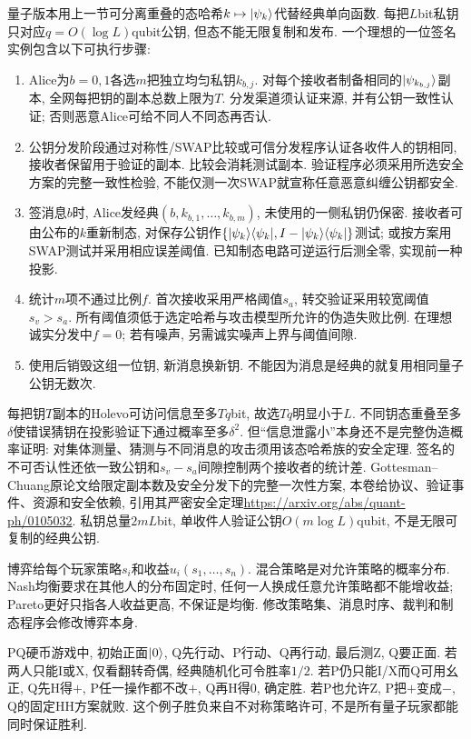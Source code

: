 量子版本用上一节可分离重叠的态哈希$k\mapsto\lvert \psi_k\rangle$代替经典单向函数. 每把$L$bit私钥只对应$q=O(\log L)$qubit公钥, 但态不能无限复制和发布. 一个理想的一位签名实例包含以下可执行步骤:
\begin{enumerate}
\item Alice为$b=0,1$各选$m$把独立均匀私钥$k_{b,j}$. 对每个接收者制备相同的$\lvert \psi_{k_{b,j}}\rangle$副本, 全网每把钥的副本总数上限为$T$. 分发渠道须认证来源, 并有公钥一致性认证; 否则恶意Alice可给不同人不同态再否认.
\item 公钥分发阶段通过对称性/SWAP比较或可信分发程序认证各收件人的钥相同, 接收者保留用于验证的副本. 比较会消耗测试副本. 验证程序必须采用所选安全方案的完整一致性检验, 不能仅测一次SWAP就宣称任意恶意纠缠公钥都安全.
\item 签消息$b$时, Alice发经典$(b,k_{b,1},\ldots,k_{b,m})$, 未使用的一侧私钥仍保密. 接收者可由公布的$k$重新制态, 对保存公钥作$\{\lvert \psi_k\rangle\langle \psi_k\rvert,I-\lvert \psi_k\rangle\langle \psi_k\rvert\}$测试; 或按方案用SWAP测试并采用相应误差阈值. 已知制态电路可逆运行后测全零, 实现前一种投影.
\item 统计$m$项不通过比例$f$. 首次接收采用严格阈值$s_a$, 转交验证采用较宽阈值$s_v>s_a$. 所有阈值须低于选定哈希与攻击模型所允许的伪造失败比例. 在理想诚实分发中$f=0$; 若有噪声, 另需诚实噪声上界与阈值间隙.
\item 使用后销毁这组一位钥, 新消息换新钥. 不能因为消息是经典的就复用相同量子公钥无数次.
\end{enumerate}
每把钥$T$副本的Holevo可访问信息至多$Tq$bit, 故选$Tq$明显小于$L$. 不同钥态重叠至多$\delta$使错误猜钥在投影验证下通过概率至多$\delta^2$. 但“信息泄露小”本身还不是完整伪造概率证明: 对集体测量、猜测与不同消息的攻击须用该态哈希族的安全定理. 签名的不可否认性还依一致公钥和$s_v-s_a$间隙控制两个接收者的统计差. Gottesman--Chuang原论文给限定副本数及安全分发下的完整一次性方案, 本卷给协议、验证事件、资源和安全依赖, 引用其严密安全定理\url{https://arxiv.org/abs/quant-ph/0105032}. 私钥总量$2mL$bit, 单收件人验证公钥$O(m\log L)$qubit, 不是无限可复制的经典公钥.

博弈给每个玩家策略$s_i$和收益$u_i(s_1,\ldots,s_n)$. 混合策略是对允许策略的概率分布. Nash均衡要求在其他人的分布固定时, 任何一人换成任意允许策略都不能增收益; Pareto更好只指各人收益更高, 不保证是均衡. 修改策略集、消息时序、裁判和制态程序会修改博弈本身.

PQ硬币游戏中, 初始正面$\lvert 0\rangle$, Q先行动、P行动、Q再行动, 最后测Z, Q要正面. 若两人只能I或X, 仅看翻转奇偶, 经典随机化可令胜率$1/2$. 若P仍只能I/X而Q可用幺正, Q先H得$+$, P任一操作都不改$+$, Q再H得0, 确定胜. 若P也允许Z, P把$+$变成$-$, Q的固定HH方案就败. 这个例子胜负来自不对称策略许可, 不是所有量子玩家都能同时保证胜利.

